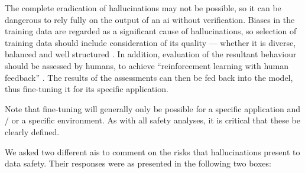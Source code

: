 The complete eradication of hallucinations may not be possible, so it can be dangerous to rely fully
on the output of an \gls{ai} without verification. Biases in the training data are regarded as a
significant cause of hallucinations, so selection of training data should include consideration
of its quality --- whether it is diverse, balanced and well structured
\cite{citation:halucinations:website}. In addition, evaluation of the resultant behaviour should be
assessed by humans, to achieve ``reinforcement learning with human feedback''
\cite{citation:howchatgptworks:website}.
The results of the assessments can then be fed back into the model,
thus fine-tuning it for its specific application.

Note that fine-tuning will generally only be possible for a specific application and / or a specific
environment. As with all safety analyses, it is critical that these be clearly defined.

We asked two different \glspl{ai} to comment on the risks that hallucinations present to data safety. Their responses were as presented in the
following two boxes:

